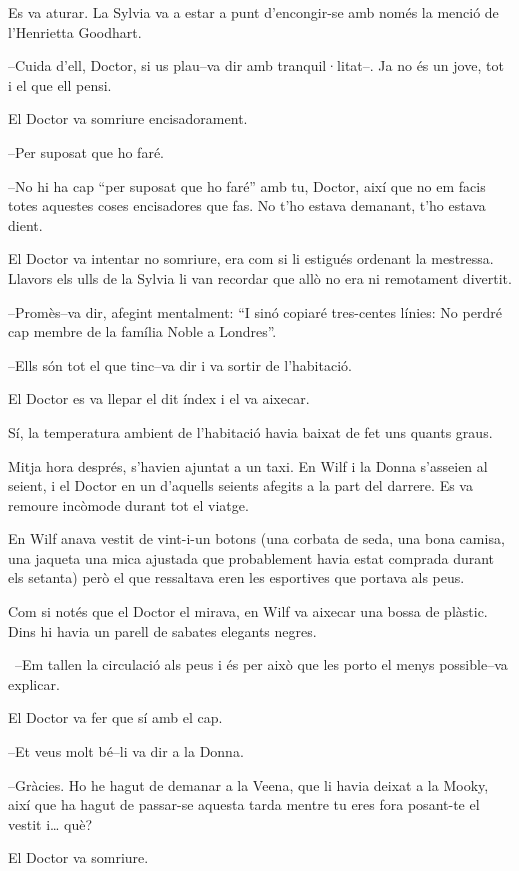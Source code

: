Es va aturar. La Sylvia va a estar a punt d'encongir-se amb només la
menció de l'Henrietta Goodhart.

--Cuida d'ell, Doctor, si us plau--va dir amb tranquil·litat--. Ja no és
un jove, tot i el que ell pensi.

El Doctor va somriure encisadorament.

--Per suposat que ho faré.

--No hi ha cap ``per suposat que ho faré'' amb tu, Doctor, així que no
em facis totes aquestes coses encisadores que fas. No t'ho estava
demanant, t'ho estava dient.

El Doctor va intentar no somriure, era com si li estigués ordenant la
mestressa. Llavors els ulls de la Sylvia li van recordar que allò no era
ni remotament divertit.

--Promès--va dir, afegint mentalment: ``I sinó copiaré tres-centes
línies: No perdré cap membre de la família Noble a Londres''.

--Ells són tot el que tinc--va dir i va sortir de l'habitació.

El Doctor es va llepar el dit índex i el va aixecar.

Sí, la temperatura ambient de l'habitació havia baixat de fet uns quants
graus.

Mitja hora després, s'havien ajuntat a un taxi. En Wilf i la Donna
s'asseien al seient, i el Doctor en un d'aquells seients afegits a la
part del darrere. Es va remoure incòmode durant tot el viatge.

En Wilf anava vestit de vint-i-un botons (una corbata de seda, una bona
camisa, una jaqueta una mica ajustada que probablement havia estat
comprada durant els setanta) però el que ressaltava eren les esportives
que portava als peus.

Com si notés que el Doctor el mirava, en Wilf va aixecar una bossa de
plàstic. Dins hi havia un parell de sabates elegants negres.

~--Em tallen la circulació als peus i és per això que les porto el menys
possible--va explicar.

El Doctor va fer que sí amb el cap.

--Et veus molt bé--li va dir a la Donna.

--Gràcies. Ho he hagut de demanar a la Veena, que li havia deixat a la
Mooky, així que ha hagut de passar-se aquesta tarda mentre tu eres fora
posant-te el vestit i\ldots{} què?

El Doctor va somriure.

